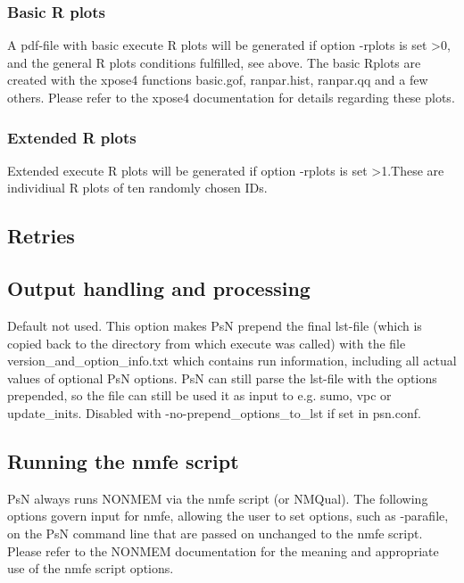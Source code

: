 \subsubsection*{Basic R plots}
A pdf-file with basic execute R plots will be generated if option -rplots is set >0, and the general R plots conditions fulfilled, see above.
The basic Rplots are created with the xpose4 functions basic.gof, ranpar.hist, ranpar.qq and a few others. Please refer to the xpose4 documentation for details regarding these plots.

\subsubsection*{Extended R plots}
Extended execute R plots will be generated if option -rplots is set >1.These are individiual R plots of ten randomly chosen IDs.

\subsection{Retries}


\subsection{Output handling and processing}

\begin{optionlist}
Default not used. This option makes PsN prepend the final lst-file (which is copied back to the directory from which execute was called) with 
the file version\_and\_option\_info.txt which contains run information, including     all actual values of optional PsN options. PsN can still parse 
the lst-file with the options prepended, so the file can still be used it as input to e.g. sumo, vpc or update\_inits. Disabled with 
-no-prepend\_options\_to\_lst if set in psn.conf.
\nextopt
\end{optionlist}

\subsection{Running the nmfe script}
PsN always runs NONMEM via the nmfe script (or NMQual). 
The following options govern input for
nmfe, allowing the user to set options, such as \mbox{-parafile}, on the PsN command line that
are passed on unchanged to the nmfe script.
Please refer to the NONMEM documentation for the meaning and appropriate use
of the nmfe script options.


